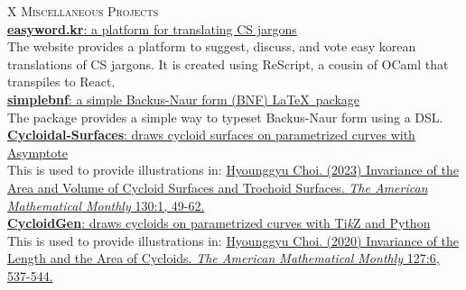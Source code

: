 \documentclass[a4paper,10pt]{memoir}
\begin{document}
\begin{tblr}{X}
  {\Large\textsc{Miscellaneous Projects}}                                                                                                                                                                                                                                                    \\ \hline
  \href{https://easyword.kr/}{\textbf{easyword.kr}: a platform for translating CS jargons}                                                                                                                                                                                                   \\
  The website provides a platform to suggest, discuss, and vote easy korean translations of CS jargons. It is created using ReScript, a cousin of OCaml that transpiles to React.                                                                                                            \\

  \href{https://github.com/Zeta611/simplebnf}{\textbf{simplebnf}: a simple Backus-Naur form (BNF) \LaTeX\ package}                                                                                                                                                                           \\
  The package provides a simple way to typeset Backus-Naur form using a DSL.                                                                                                                                                                                                                 \\

  \href{https://github.com/Zeta611/cycloidal-surfaces}{\textbf{Cycloidal-Surfaces}: draws cycloid surfaces on parametrized curves with Asymptote}                                                                                                                                            \\
  This is used to provide illustrations in: \href{https://www.tandfonline.com/doi/abs/10.1080/00029890.2022.2130677}{Hyounggyu Choi. (2023) Invariance of the Area and Volume of Cycloid Surfaces and Trochoid Surfaces. \textit{The American Mathematical Monthly} 130:1, 49-62.} \\

  \href{https://github.com/Zeta611/CycloidGen}{\textbf{CycloidGen}: draws cycloids on parametrized curves with Ti\textit{k}Z and Python}                                                                                                                                                     \\
  This is used to provide illustrations in: \href{https://www.tandfonline.com/doi/abs/10.1080/00029890.2020.1743611}{Hyounggyu Choi. (2020) Invariance of the Length and the Area of Cycloids. \textit{The American Mathematical Monthly} 127:6, 537-544.}                                \\


\end{tblr}
\end{document}
